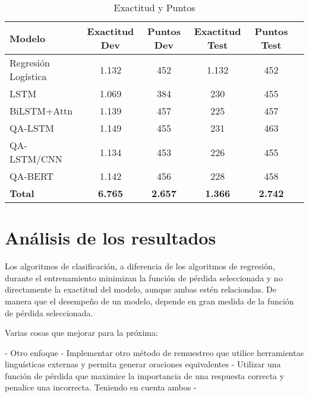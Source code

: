 \begin{table}[!tb]
  \begin{center}
    \caption{Exactitud y Puntos}
    \begin{tabular}{l|c|c|c|c|c}
      \textbf{Modelo} & \textbf{Exactitud Dev} & \textbf{Puntos Dev} & \textbf{Exactitud Test} & \textbf{Puntos Test} \\
      \hline
      Regresión Logística & 1.132 & 452 & 1.132 & 452\\
      LSTM & 1.069 & 384 & 230 & 455 \\
      BiLSTM+Attn & 1.139 & 457 & 225 & 457 \\
      QA-LSTM & 1.149 & 455 & 231 & 463 \\
      QA-LSTM/CNN & 1.134 & 453 & 226 & 455 \\
      QA-BERT & 1.142 & 456 & 228 & 458 \\ 
      \textbf{Total} & \textbf{6.765} & \textbf{2.657} & \textbf{1.366} & \textbf{2.742}\\
    \end{tabular}
  \end{center}
  \label{results_all}
\end{table}


\section{Análisis de los resultados}

Los algoritmos de clasificación, a diferencia de los algoritmos de regresión, durante el entrenamiento minimizan la función de pérdida seleccionada y no directamente la exactitud del modelo, aunque ambas estén relaciondas. De manera que el desempeño de un modelo, depende en gran medida de la función de pérdida seleccionada. 


Varias cosas que mejorar para la próxima:

- Otro enfoque
- Implementar otro método de remuestreo que utilice herramientas linguísticas externas y permita generar oraciones equivalentes
- Utilizar una función de pérdida que maximice la importancia de una respuesta correcta y penalice una incorrecta. Teniendo en cuenta ambos 
-



